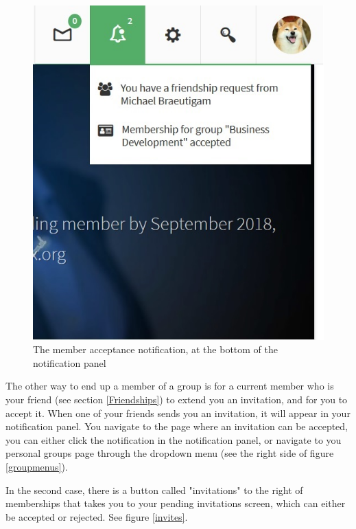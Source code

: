 \documentclass[10pt]{article}
\begin{document}
\begin{figure}[h]
    \centering
    \includegraphics[scale=0.5]{images/youaremember.jpg}
    \caption{The member acceptance notification, at the bottom of the notification panel}
    \label{youaremember}
\end{figure}

\begin{flushleft}
The other way to end up a member of a group is for a current member who is your friend (see section \ref{Friendships}) to extend you an invitation, and for you to accept it.  When one of your friends sends you an invitation, it will appear in your notification panel.  You navigate to the page where an invitation can be accepted, you can either click the notification in the notification panel, or navigate to you personal groups page through the dropdown menu (see the right side of figure \ref{groupmenus}). 
\end{flushleft}

\begin{flushleft}
 In the second case, there is a button called "invitations" to the right of memberships that takes you to your pending invitations screen, which can either be accepted or rejected.  See figure \ref{invites}. 
\end{flushleft}
\end{document}
